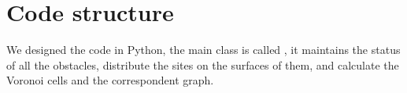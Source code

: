 \documentclass[dissertation.tex]{subfiles}
\begin{document}
\chapter{Code structure}
We designed the code in Python, the main class is called
, it maintains the status of all the obstacles,
distribute the sites on the surfaces of them, and calculate the
Voronoi cells and the correspondent graph. 
\end{document}
